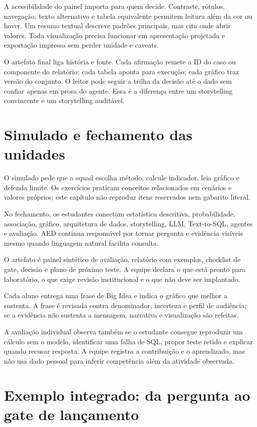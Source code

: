 A acessibilidade do painel importa para quem decide. Contraste, rótulos, navegação, texto alternativo e tabela equivalente permitem leitura além da cor ou hover. Um resumo textual descreve padrões principais, mas cita onde abrir valores. Toda visualização precisa funcionar em apresentação projetada e exportação impressa sem perder unidade e caveats.

O artefato final liga história e fonte. Cada afirmação remete a ID do caso ou componente do relatório; cada tabela aponta para execução; cada gráfico traz versão do conjunto. O leitor pode seguir a trilha da decisão até o dado sem confiar apenas em prosa do agente. Essa é a diferença entre um storytelling convincente e um storytelling auditável.

\section{Simulado e fechamento das unidades}

O simulado pede que a squad escolha método, calcule indicador, leia gráfico e defenda limite. Os exercícios praticam conceitos relacionados em cenários e valores próprios; este capítulo não reproduz itens reservados nem gabarito literal.

No fechamento, os estudantes conectam estatística descritiva, probabilidade, associação, gráfico, arquitetura de dados, storytelling, LLM, Text-to-SQL, agentes e avaliação. AED continua responsável por tornar pergunta e evidência visíveis mesmo quando linguagem natural facilita consulta.

O artefato é painel sintético de avaliação, relatório com exemplos, checklist de gate, decisão e plano de próximo teste. A equipe declara o que está pronto para laboratório, o que exige revisão institucional e o que não deve ser implantado.

Cada aluno entrega uma frase de Big Idea e indica o gráfico que melhor a sustenta. A frase é revisada contra denominador, incerteza e perfil de audiência; se a evidência não sustenta a mensagem, narrativa e visualização são refeitas.

A avaliação individual observa também se o estudante consegue reproduzir um cálculo sem o modelo, identificar uma falha de SQL, propor teste retido e explicar quando recusar resposta. A equipe registra a contribuição e o aprendizado, mas não usa dado pessoal para inferir competência além da atividade observada.

\section{Exemplo integrado: da pergunta ao gate de lançamento}

